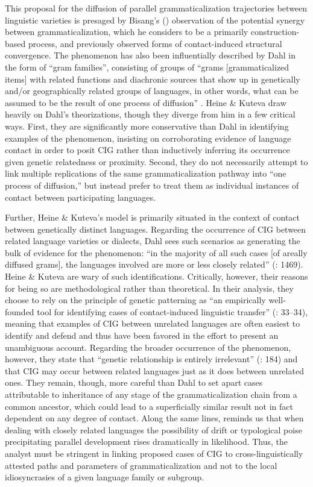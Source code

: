 \documentclass[output=paper]{langsci/langscibook}
\begin{document}
This proposal for the diffusion of parallel grammaticalization trajectories between linguistic varieties is presaged by Bisang's (\citeyear{Bisang1998}) observation of the potential synergy between grammaticalization, which he considers to be a primarily construction-based process, and previously observed forms of contact-induced structural convergence. The phenomenon has also been influentially described by Dahl in the form of “gram families”, consisting of groups of “grams [grammaticalized items] with related functions and diachronic sources that show up in genetically and/or geographically related groups of languages, in other words, what can be assumed to be the result of one process of diffusion” \citep[1469]{Dahl2001}. Heine \& Kuteva draw heavily on Dahl’s theorizations, though they diverge from him in a few critical ways. First, they are significantly more conservative than Dahl in identifying examples of the phenomenon, insisting on corroborating evidence of language contact in order to posit CIG rather than inductively inferring its occurrence given genetic relatedness or proximity. Second, they do not necessarily attempt to link multiple replications of the same grammaticalization pathway into “one process of diffusion,” but instead prefer to treat them as individual instances of contact between participating languages. 

Further, Heine \& Kuteva’s model is primarily situated in the context of contact between genetically distinct languages. Regarding the occurrence of CIG between related language varieties or dialects, Dahl sees such scenarios as generating the bulk of evidence for the phenomenon: “in the majority of all such cases [of areally diffused grams], the languages involved are more or less closely related” (\citeyear{Dahl2001}: 1469). Heine \& Kuteva are wary of such identifications. Critically, however, their reasons for being so are methodological rather than theoretical. In their analysis, they choose to rely on the principle of genetic patterning as “an empirically well-founded tool for identifying cases of contact-induced linguistic transfer” (\citeyear{HeineKuteva2005}: 33--34), meaning that examples of CIG between unrelated languages are often easiest to identify and defend and thus have been favored in the effort to present an unambiguous account. Regarding the broader occurrence of the phenomenon, however, they state that “genetic relationship is entirely irrelevant” (\citeyear{HeineKuteva2005}: 184) and that CIG may occur between related languages just as it does between unrelated ones. They remain, though, more careful than Dahl to set apart cases attributable to inheritance of any stage of the grammaticalization chain from a common ancestor, which could lead to a superficially similar result not in fact dependent on any degree of contact. Along the same lines, \citet{Law2014} reminds us that when dealing with closely related languages the possibility of drift or typological poise precipitating parallel development rises dramatically in likelihood. Thus, the analyst must be stringent in linking proposed cases of CIG to cross-linguistically attested paths and parameters of grammaticalization and not to the local idiosyncrasies of a given language family or subgroup.
\end{document}
